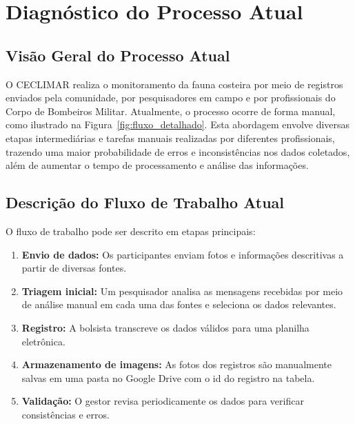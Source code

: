 \chapter{Diagnóstico do Processo Atual} \label{chapter:diagnostico}
\section{Visão Geral do Processo Atual}

O CECLIMAR realiza o monitoramento da fauna costeira por meio de registros enviados pela comunidade, 
por pesquisadores em campo e por profissionais do Corpo de Bombeiros Militar. Atualmente, o processo 
ocorre de forma manual, como ilustrado na Figura~\ref{fig:fluxo_detalhado}. Esta abordagem envolve 
diversas etapas intermediárias e tarefas manuais realizadas por diferentes profissionais, trazendo
uma maior probabilidade de erros e inconsistências nos dados coletados, além de aumentar o tempo
de processamento e análise das informações.

\section{Descrição do Fluxo de Trabalho Atual}

O fluxo de trabalho pode ser descrito em etapas principais:

\begin{enumerate}
    \item \textbf{Envio de dados:} Os participantes enviam fotos e informações descritivas a partir de diversas fontes.
    \item \textbf{Triagem inicial:} Um pesquisador analisa as mensagens recebidas por meio de análise manual em cada uma das fontes e seleciona os dados relevantes.
    \item \textbf{Registro:} A bolsista transcreve os dados válidos para uma planilha eletrônica.
    \item \textbf{Armazenamento de imagens:} As fotos dos registros são manualmente salvas em uma pasta no Google Drive com o id do registro na tabela.
    \item \textbf{Validação:} O gestor revisa periodicamente os dados para verificar consistências e erros.
\end{enumerate}

